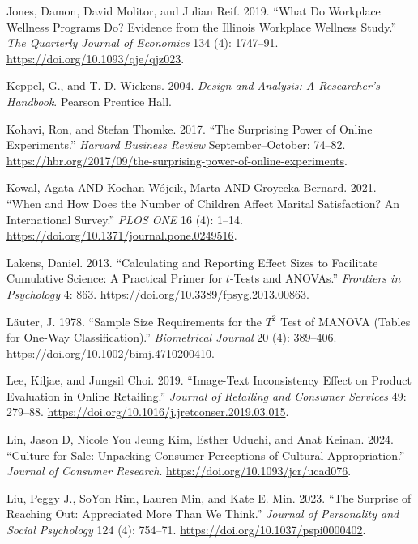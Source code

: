 \documentclass[
  11pt,
  letterpaper,
]{scrbook}
\newlength{\cslhangindent}
\newlength{\cslentryspacingunit} %
\newenvironment{CSLReferences}[2] %
 {%
  \setlength{\parindent}{0pt}
  \ifodd #1
  \let\oldpar\par
  \def\par{\hangindent=\cslhangindent\oldpar}
  \fi
  \setlength{\parskip}{#2\cslentryspacingunit}
 }%
 {}
\theoremstyle{definition}
\theoremstyle{remark}
\begin{document}
\begin{CSLReferences}{1}{0}
\leavevmode{}%
Jones, Damon, David Molitor, and Julian Reif. 2019. {``What Do Workplace
Wellness Programs Do? Evidence from the {I}llinois Workplace Wellness
Study.''} \emph{The Quarterly Journal of Economics} 134 (4): 1747--91.
\url{https://doi.org/10.1093/qje/qjz023}.

\leavevmode{}%
Keppel, G., and T. D. Wickens. 2004. \emph{Design and Analysis: A
Researcher's Handbook}. Pearson Prentice Hall.

\leavevmode{}%
Kohavi, Ron, and Stefan Thomke. 2017. {``The Surprising Power of Online
Experiments.''} \emph{Harvard Business Review} September--October:
74--82.
\url{https://hbr.org/2017/09/the-surprising-power-of-online-experiments}.

\leavevmode{}%
Kowal, Agata AND Kochan-Wójcik, Marta AND Groyecka-Bernard. 2021.
{``When and How Does the Number of Children Affect Marital Satisfaction?
An International Survey.''} \emph{PLOS ONE} 16 (4): 1--14.
\url{https://doi.org/10.1371/journal.pone.0249516}.

\leavevmode{}%
Lakens, Daniel. 2013. {``Calculating and Reporting Effect Sizes to
Facilitate Cumulative Science: A Practical Primer for \(t\)-Tests and
ANOVAs.''} \emph{Frontiers in Psychology} 4: 863.
\url{https://doi.org/10.3389/fpsyg.2013.00863}.

\leavevmode{}%
Läuter, J. 1978. {``Sample Size Requirements for the \(T^2\) Test of
{MANOVA} (Tables for One-Way Classification).''} \emph{Biometrical
Journal} 20 (4): 389--406.
\url{https://doi.org/10.1002/bimj.4710200410}.

\leavevmode{}%
Lee, Kiljae, and Jungsil Choi. 2019. {``Image-Text Inconsistency Effect
on Product Evaluation in Online Retailing.''} \emph{Journal of Retailing
and Consumer Services} 49: 279--88.
\url{https://doi.org/10.1016/j.jretconser.2019.03.015}.

\leavevmode{}%
Lin, Jason D, Nicole You Jeung Kim, Esther Uduehi, and Anat Keinan.
2024. {``Culture for Sale: Unpacking Consumer Perceptions of Cultural
Appropriation.''} \emph{Journal of Consumer Research}.
\url{https://doi.org/10.1093/jcr/ucad076}.

\leavevmode{}%
Liu, Peggy J., SoYon Rim, Lauren Min, and Kate E. Min. 2023. {``The
Surprise of Reaching Out: Appreciated More Than We Think.''}
\emph{Journal of Personality and Social Psychology} 124 (4): 754--71.
\url{https://doi.org/10.1037/pspi0000402}.


\end{CSLReferences}
\end{document}
